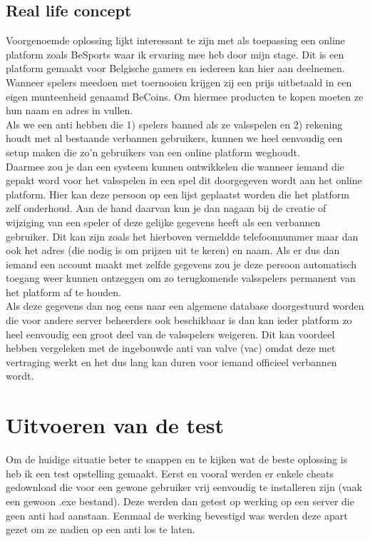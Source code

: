 \documentclass[pdftex,a4paper,12pt,twoside]{report}
\begin{document}
\section{Real life concept}
\label{sec:concept}
Voorgenoemde oplossing lijkt interessant te zijn met als toepassing een online platform zoals BeSports waar ik ervaring mee heb door mijn stage. 
Dit is een platform gemaakt voor Belgische gamers en iedereen kan hier aan deelnemen. Wanneer spelers meedoen met toernooien krijgen zij een prijs uitbetaald in een eigen munteenheid genaamd BeCoins.
Om hiermee producten te kopen moeten ze hun naam en adres in vullen.
\\

Als we een \gls{anti} hebben die 1) spelers banned als ze valsspelen en 2) rekening houdt met al bestaande verbannen gebruikers, kunnen we heel eenvoudig een setup maken die zo'n gebruikers van een online platform weghoudt. 
\\

Daarmee zou je dan een systeem kunnen ontwikkelen die wanneer iemand die gepakt word voor het valsspelen in een spel dit doorgegeven wordt aan het online platform. Hier kan deze persoon op een lijst geplaatst worden die het platform zelf onderhoud. Aan de hand daarvan kun je dan nagaan bij de creatie of wijziging van een speler of deze gelijke gegevens heeft als een verbannen gebruiker. Dit kan zijn zoals het hierboven vermeldde telefoonnummer maar dan ook het adres (die nodig is om prijzen uit te keren) en naam. Als er dus dan iemand een account maakt met zelfde gegevens zou je deze persoon automatisch toegang weer kunnen ontzeggen om zo terugkomende valsspelers permanent van het platform af te houden.
\\

Als deze gegevens dan nog eens naar een algemene database doorgestuurd worden die voor andere server beheerders ook beschikbaar is dan kan ieder platform zo heel eenvoudig een groot deel van de valsspelers weigeren. Dit kan voordeel hebben vergeleken met de ingebouwde \gls{anti} van \gls{valve} (\gls{vac}) omdat deze met vertraging werkt en het dus lang kan duren voor iemand officieel verbannen wordt.

\chapter{Uitvoeren van de test}
\label{ch:test}
Om de huidige situatie beter te snappen en te kijken wat de beste oplossing is heb ik een test opstelling gemaakt. Eerst en vooral werden er enkele \gls{cheat}s gedownload die voor een gewone gebruiker vrij eenvoudig te installeren zijn (vaak een gewoon .exe bestand). Deze werden dan getest op werking op een server die geen \gls{anti} had aanstaan. Eenmaal de werking bevestigd was werden deze apart gezet om ze nadien op een \gls{anti} los te laten.
\end{document}
